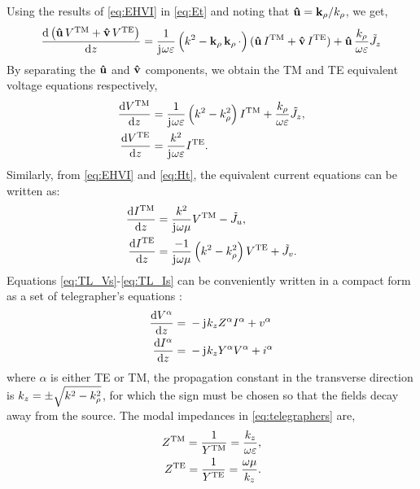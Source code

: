 \documentclass[12pt]{article}
\begin{document}
%
Using the results of \eqref{eq:EHVI} in \eqref{eq:Et} and noting that $\mathbf{\hat u} = \mathbf{k}_{\rho}/k_{\rho}$, we get,
%
\begin{equation}
  \dv{\left(\mathbf{\hat u} \, V^{\mathrm{TM}} + \mathbf{\hat v} \,V^{\mathrm{TE}} \right)}{z} = \frac{1}{\mathrm{j}\mkern1mu \omega \varepsilon}\left( k^2 - \mathbf{k}_{\rho} \,\mathbf{k}_{\rho}
  \,\cdot \right) (\mathbf{\hat u}\, I^{\mathrm{TM}} +
  \mathbf{\hat v} \, I^{\mathrm{TE}}) + \mathbf{\hat u} \, \frac{k_{\rho}}{\omega \varepsilon} \tilde{J}_z
  \label{eq:Vinuv}
\end{equation}
%
By separating the $\mathbf{\hat u}$ and $\mathbf{\hat v}$ components, we obtain the TM and TE equivalent voltage equations respectively,
%
\begin{subequations}
  \begin{align}
    \dv{V^{\mathrm{TM}}}{z} ={}&
    \frac{1}{\mathrm{j}\mkern1mu \omega \varepsilon}\left( k^2 - k_{\rho}^2 \right)I^{\mathrm{TM}} + \frac{k_{\rho}}{\omega \varepsilon} \tilde{J}_z,
    \label{eq:V_TM}\\
    \dv{V^{\mathrm{TE}}}{z} ={}&
    \frac{k^2}{\mathrm{j}\mkern1mu \omega \varepsilon} I^{\mathrm{TE}}.
    \label{eq:V_TE}
  \end{align}
  \label{eq:TL_Vs}%
\end{subequations}
%
Similarly, from \eqref{eq:EHVI} and \eqref{eq:Ht}, the equivalent current equations can be written as:
%
\begin{subequations}
  \begin{align}
    \dv{I^{\mathrm{TM}}}{z} ={}&
    \frac{k^2}{\mathrm{j}\mkern1mu \omega \mu} V^{\mathrm{TM}} - \tilde{J}_u,
    \label{eq:I_TM}\\
    \dv{I^{\mathrm{TE}}}{z} ={}&
    \frac{-1}{\mathrm{j}\mkern1mu \omega \mu}\left( k^2 - k_{\rho}^2 \right)V^{\mathrm{TE}} + \tilde{J}_v.
    \label{eq:I_TE}
  \end{align}
  \label{eq:TL_Is}%
\end{subequations}
%
Equations \eqref{eq:TL_Vs}-\eqref{eq:TL_Is} can be conveniently written in a compact form as a set of telegrapher's equations \cite[p. 190]{Felsen1994}:
%
\begin{subequations}
  \begin{align}
    \dv{V^{\alpha}}{z} ={}& -\mathrm{j}\mkern1mu k_z Z^{\alpha}I^{\alpha} + v^{\alpha}
    \label{eq:TL_finalV}\\
    \dv{I^{\alpha}}{z} ={}& -\mathrm{j}\mkern1mu k_z Y^{\alpha}V^{\alpha} + i^{\alpha}
    \label{eq:TL_finalI}
  \end{align}
  \label{eq:telegraphers}%
\end{subequations}
%
where $\alpha$ is either TE or TM, the propagation constant in the transverse direction is $k_z = \pm \sqrt{k^2 - k_{\rho}^2}$, for which the sign must be chosen so that the fields decay away from the source. The modal impedances in \eqref{eq:telegraphers} are,
%
\begin{subequations}
  \begin{align}
    Z^{\mathrm{TM}} = \frac{1}{Y^{\mathrm{TM}}} = \frac{k_z}{\omega \varepsilon},
    \label{eq:z_TM}\\
    Z^{\mathrm{TE}} = \frac{1}{Y^{\mathrm{TE}}} = \frac{\omega \mu}{k_z}.
    \label{eq:z_TE}
  \end{align}
  \label{eq:Z}%
\end{subequations}
%
\end{document}
